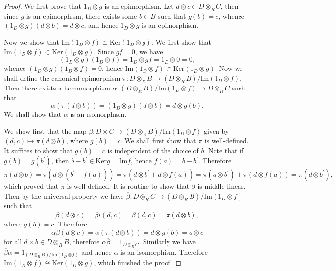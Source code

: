 \begin{proof}
We first prove that $1_D\otimes g$ is an epimorphism. Let $d\otimes c\in D\otimes_RC$, then since $g$ is an epimorphism, there exists some $b\in B$ such that $g(b)=c$, whence $(1_D\otimes g)(d\otimes b)=d\otimes c$, and hence $1_D\otimes g$ is an epimorphism.\par
Now we show that $\mathrm{Im}(1_D\otimes f)\cong\mathrm{Ker}(1_D\otimes g)$. We first show that $\mathrm{Im}(1_D\otimes f)\subset\mathrm{Ker}(1_D\otimes g)$. Since $gf=0$, we have 
$$
\left( 1_D\otimes g \right) \left( 1_D\otimes f \right) =1_D\otimes gf=1_D\otimes 0=0,
$$
whence $(1_D\otimes g)(1_D\otimes f)=0$, hence $\mathrm{Im}(1_D\otimes f)\subset\mathrm{Ker}(1_D\otimes g)$. Now we shall define the canonical epimorphism $\pi:D\otimes_RB\to(D\otimes_RB)/\mathrm{Im}(1_D\otimes f)$. Then there exists a homomorphism $\alpha:(D\otimes_RB)/\mathrm{Im}(1_D\otimes f)\to D\otimes_RC$ such that 
$$
\alpha \left( \pi \left( d\otimes b \right) \right) =\left( 1_D\otimes g \right) \left( d\otimes b \right) =d\otimes g\left( b \right) .
$$
We shall show that $\alpha$ is an isomorphism.\par
We show first that the map $\beta:D\times C\to(D\otimes_RB)/\mathrm{Im}(1_D\otimes f)$ given by $(d,c)\mapsto\pi(d\otimes b)$, where $g(b)=c$. We shall first show that $\pi$ is well-defined. It suffices to show that $g(b)=c$ is independent of the choice of $b$. Note that if $g(b)=g(b^\prime)$, then $b-b^\prime\in\mathrm{Ker}g=\mathrm{Im}f$, hence $f(a)=b-b^\prime$. Therefore 
$$
\pi \left( d\otimes b \right) =\pi \left( d\otimes \left( b^{\prime}+f\left( a \right) \right) \right) =\pi \left( d\otimes b^{\prime}+d\otimes f\left( a \right) \right) =\pi \left( d\otimes b^{\prime} \right) +\pi \left( d\otimes f\left( a \right) \right) =\pi \left( d\otimes b^{\prime} \right) ,
$$
which proved that $\pi$ is well-defined. It is routine to show that $\beta$ is middle linear. Then by the universal property we have $\overline{\beta}:D\otimes_RC\to(D\otimes_RB)/\mathrm{Im}(1_D\otimes f)$ such that 
$$
\overline{\beta }\left( d\otimes c \right) =\overline{\beta }i\left( d,c \right) =\beta \left( d,c \right) =\pi \left( d\otimes b \right) ,
$$
where $g(b)=c$. Therefore 
$$
\alpha \overline{\beta }\left( d\otimes c \right) =\alpha \left( \pi \left( d\otimes b \right) \right) =d\otimes g\left( b \right) =d\otimes c
$$
for all $d\times b\in D\otimes_RB$, therefore $\alpha \overline{\beta }=1_{D\otimes _RC}$. Similarly we have $\overline{\beta }\alpha =1_{\left( D\otimes _RB \right) /\mathrm{Im}\left( 1_D\otimes f \right)}$ and hence $\alpha$ is an isomorphism. Therefore $\mathrm{Im}\left( 1_D\otimes f \right) \cong \mathrm{Ker}\left( 1_D\otimes g \right) $, which finished the proof.
\end{proof}
